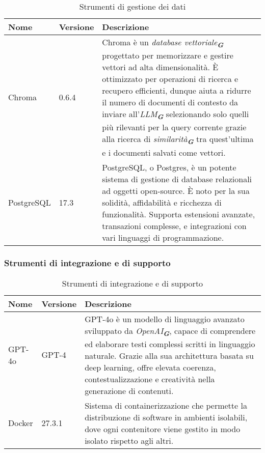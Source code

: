 \begin{table}[h!]
    \centering
    \renewcommand{\arraystretch}{1.6} %
    \begin{tabularx}{\textwidth}{|p{2cm}|p{2cm}|X|} \hline
    \rowcolor[HTML]{FFD700} 
    \textbf{Nome} & \textbf{Versione} & \textbf{Descrizione} \\ 
    \hline
    Chroma & 0.6.4 & Chroma è un \emph{database vettoriale}\textsubscript{\textbf{\textit{G}}} progettato per memorizzare e
                    gestire vettori ad alta dimensionalità. 
                    È ottimizzato per operazioni di ricerca e recupero efficienti, dunque aiuta a ridurre il numero di documenti
                    di contesto da inviare all'\emph{LLM}\textsubscript{\textbf{\textit{G}}} selezionando solo quelli più rilevanti
                    per la query corrente grazie alla ricerca di \emph{similarità}\textsubscript{\textbf{\textit{G}}} tra 
                    quest'ultima e i documenti salvati come vettori. \\ \hline
    PostgreSQL & 17.3 & PostgreSQL, o Postgres, è un potente sistema di gestione di database relazionali ad oggetti open-source. 
    È noto per la sua solidità, affidabilità e ricchezza di funzionalità. Supporta estensioni avanzate, transazioni complesse, e 
    integrazioni con vari linguaggi di programmazione. \\ \hline
    \end{tabularx}
    \caption{Strumenti di gestione dei dati}
\end{table}

\subsubsection{Strumenti di integrazione e di supporto}
\label{subsec:strumenti_integrazione_supporto}


\begin{table}[h!]
    \centering
    \renewcommand{\arraystretch}{1.6} %
    \begin{tabularx}{\textwidth}{|p{2cm}|p{2cm}|X|} \hline
    \rowcolor[HTML]{FFD700} 
    \textbf{Nome} & \textbf{Versione} & \textbf{Descrizione} \\ 
    \hline
    GPT-4o & GPT-4 & GPT-4o è un modello di linguaggio avanzato sviluppato da \emph{OpenAI}\textsubscript{\textbf{\textit{G}}},
    capace di comprendere ed elaborare testi complessi scritti in linguaggio naturale. 
    Grazie alla sua architettura basata su deep learning, offre elevata coerenza, contestualizzazione e creatività nella generazione
    di contenuti. \\ \hline
    Docker & 27.3.1 & Sistema di containerizzazione che permette la distribuzione
    di software in ambienti isolabili, dove ogni contenitore
    viene gestito in modo isolato rispetto agli altri. \\ \hline
    \end{tabularx}
    \caption{Strumenti di integrazione e di supporto}
\end{table}

